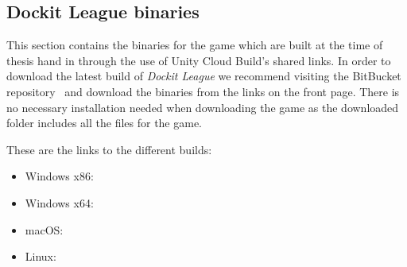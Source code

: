 \subsection{Dockit League binaries}
This section contains the binaries for the game which are built at the time of thesis hand in through the use of Unity Cloud Build's shared links. In order to download the latest build of \emph{Dockit League} we recommend visiting the BitBucket repository~\cite{bitbucketRepo} and download the binaries from the links on the front page. There is no necessary installation needed when downloading the game as the downloaded folder includes all the files for the game. 

These are the links to the different builds:
\begin{itemize}
    \item Windows x86:  \cite{x86build}
    \item Windows x64:  \cite{x64build}
    \item macOS:  \cite{macOSbuild}
    \item Linux:  \cite{linuxbuild}
\end{itemize}
